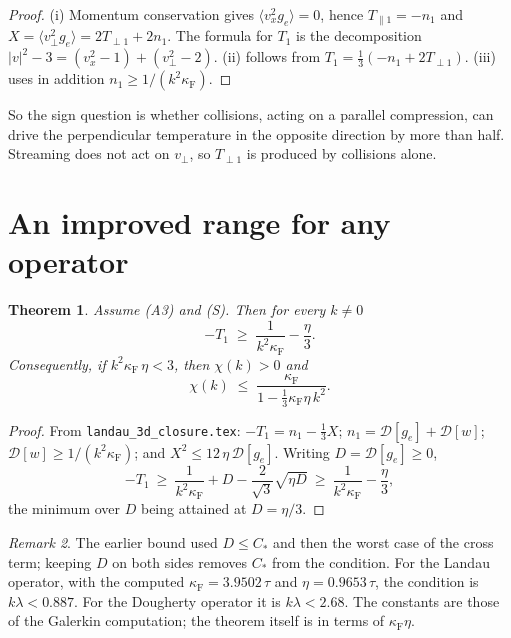 \documentclass[11pt]{article}
\newcommand{\cD}{\mathcal{D}}
\newcommand{\avg}[1]{\langle #1\rangle}
\newcommand{\Tpar}{T_{\parallel1}}
\newcommand{\Tperp}{T_{\perp1}}
\newtheorem{theorem}{Theorem}
\theoremstyle{remark}
\newtheorem{remark}[theorem]{Remark}
\begin{document}
\begin{proof}
(i) Momentum conservation gives $\avg{v_x^2g_e}=0$, hence $\Tpar=-n_1$ and
$X=\avg{v_\perp^2g_e}=2\Tperp+2n_1$. The formula for $T_1$ is the
decomposition $|v|^2-3=(v_x^2-1)+(v_\perp^2-2)$. (ii) follows from
$T_1=\tfrac13(-n_1+2\Tperp)$. (iii) uses in addition
$n_1\ge1/(k^2\kappa_{\mathrm F})$.
\end{proof}

So the sign question is whether collisions, acting on a parallel
compression, can drive the perpendicular temperature in the opposite
direction by more than half. Streaming does not act on $v_\perp$, so $\Tperp$
is produced by collisions alone.

\section{An improved range for any operator}

\begin{theorem}\label{thm:range}
Assume (A3) and (S). Then for every $k\ne0$
\begin{equation}
  -T_1\;\ge\;\frac{1}{k^2\kappa_{\mathrm F}}-\frac{\eta}{3}.
  \label{eq:lower}
\end{equation}
Consequently, if $k^2\kappa_{\mathrm F}\,\eta<3$, then $\chi(k)>0$ and
\begin{equation}
  \chi(k)\;\le\;\frac{\kappa_{\mathrm F}}{1-\tfrac13\kappa_{\mathrm F}\eta\,k^2}.
\end{equation}
\end{theorem}

\begin{proof}
From \texttt{landau\_3d\_closure.tex}: $-T_1=n_1-\tfrac13X$;
$n_1=\cD[g_e]+\cD[w]$; $\cD[w]\ge1/(k^2\kappa_{\mathrm F})$; and
$X^2\le12\,\eta\,\cD[g_e]$. Writing $D=\cD[g_e]\ge0$,
\[
  -T_1\ \ge\ \frac{1}{k^2\kappa_{\mathrm F}}+D-\frac{2}{\sqrt3}\sqrt{\eta D}
  \ \ge\ \frac{1}{k^2\kappa_{\mathrm F}}-\frac{\eta}{3},
\]
the minimum over $D$ being attained at $D=\eta/3$.
\end{proof}

\begin{remark}
The earlier bound used $D\le C_*$ and then the worst case of the cross term;
keeping $D$ on both sides removes $C_*$ from the condition. For the Landau
operator, with the computed $\kappa_{\mathrm F}=3.9502\,\tau$ and
$\eta=0.9653\,\tau$, the condition is $k\lambda<0.887$. For the Dougherty
operator it is $k\lambda<2.68$. The constants are those of the Galerkin
computation; the theorem itself is in terms of $\kappa_{\mathrm F}\eta$.
\end{remark}
\end{document}
